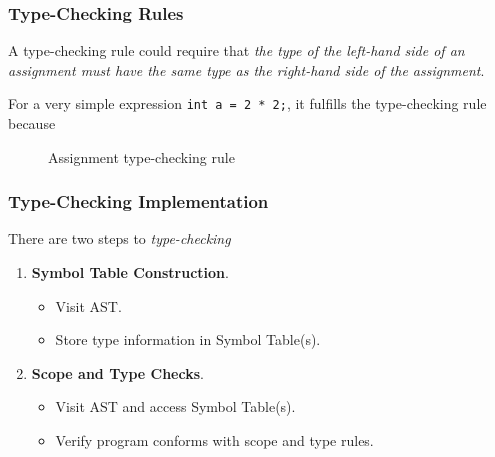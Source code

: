 \subsubsection{Type-Checking Rules}

\begin{example}
A type-checking rule could require that \textit{the type of the left-hand side of an assignment must have the same type as the right-hand side of the assignment}.
    
For a very simple expression \texttt{int a = 2 * 2;}, it fulfills the type-checking rule because
\begin{figure}[H]
    \centering
    \begin{prooftree}
    \end{prooftree}
    \caption{Assignment type-checking rule}
    \label{fig:assignment-type-checking-rule}
\end{figure}
\end{example}

\subsubsection{Type-Checking Implementation}

There are two steps to \textit{type-checking}
\begin{enumerate}
    \item \textbf{Symbol Table Construction}.
    \begin{itemize}
        \item Visit AST.
        \item Store type information in Symbol Table(s).
    \end{itemize}
    \item \textbf{Scope and Type Checks}.
    \begin{itemize}
        \item Visit AST and access Symbol Table(s).
        \item Verify program conforms with scope and type rules.
    \end{itemize}
\end{enumerate}

